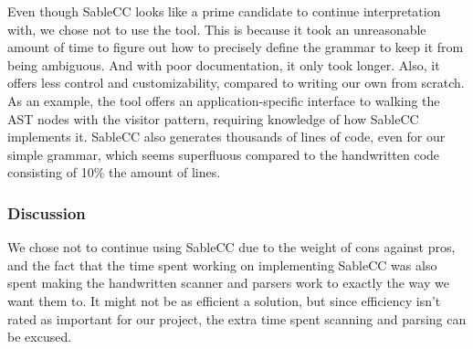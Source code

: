 Even though SableCC looks like a prime candidate to continue
interpretation with, we chose not to use the tool. This is because it
took an unreasonable amount of time to figure out how to precisely
define the grammar to keep it from being ambiguous. And with poor
documentation, it only took longer. Also, it offers less control and
customizability, compared to writing our own from scratch. As an
example, the tool offers an application-specific interface to walking
the AST nodes with the visitor pattern, requiring knowledge of how
SableCC implements it. SableCC also generates thousands of lines of
code, even for our simple grammar, which seems superfluous compared to
the handwritten code consisting of 10\% the amount of lines.

\subsubsection{Discussion}
We chose not to continue using SableCC due to the weight of cons
against pros, and the fact that the time spent working on implementing
SableCC was also spent making the handwritten scanner and parsers work
to exactly the way we want them to. It might not be as efficient a
solution, but since efficiency isn't rated as important for our project,
the extra time spent scanning and parsing can be excused.
